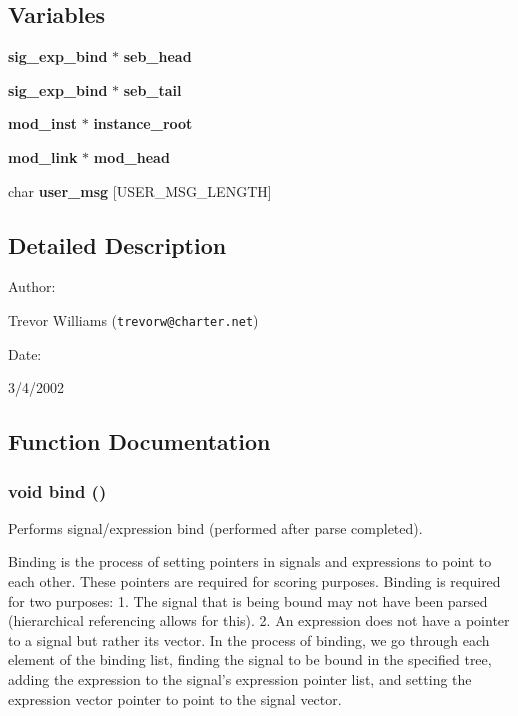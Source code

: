 \subsection*{Variables}
\begin{CompactItemize}
\item 
{\bf sig\_\-exp\_\-bind} $\ast$ {\bf seb\_\-head}
\item 
{\bf sig\_\-exp\_\-bind} $\ast$ {\bf seb\_\-tail}
\item 
{\bf mod\_\-inst} $\ast$ {\bf instance\_\-root}
\item 
{\bf mod\_\-link} $\ast$ {\bf mod\_\-head}
\item 
char {\bf user\_\-msg} [USER\_\-MSG\_\-LENGTH]
\end{CompactItemize}


\subsection{Detailed Description}


\begin{Desc}
\item[Author: ]\par
Trevor Williams ({\tt trevorw@charter.net}) \end{Desc}
\begin{Desc}
\item[Date: ]\par
3/4/2002\end{Desc}


\subsection{Function Documentation}
\subsubsection{\setlength{\rightskip}{0pt plus 5cm}void bind ()}\label{binding_8c_a8}


Performs signal/expression bind (performed after parse completed).

Binding is the process of setting pointers in signals and expressions to point to each other. These pointers are required for scoring purposes. Binding is required for two purposes: 1. The signal that is being bound may not have been parsed (hierarchical referencing allows for this). 2. An expression does not have a pointer to a signal but rather its vector. In the process of binding, we go through each element of the binding list, finding the signal to be bound in the specified tree, adding the expression to the signal's expression pointer list, and setting the expression vector pointer to point to the signal vector. 
